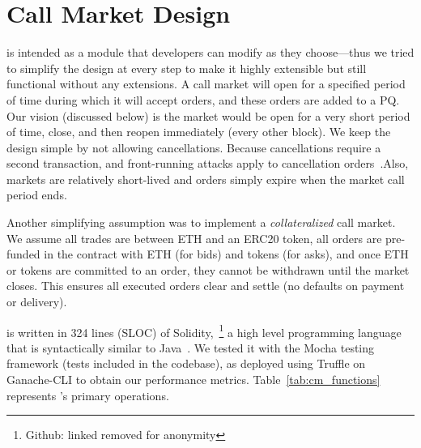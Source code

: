 
\section{Call Market Design}






\cm is intended as a module that developers can modify as they choose---thus we tried to simplify the design at every step to make it highly extensible but still functional without any extensions. A call market will open for a specified period of time during which it will accept orders, and these orders are added to a PQ. Our vision (discussed below) is the market would be open for a very short period of time, close, and then reopen immediately (\eg every other block). We keep the design simple by not allowing cancellations. Because cancellations require a second transaction, and front-running attacks apply to cancellation orders~\cite{eskandari2019sok}.Also, markets are relatively short-lived and orders simply expire when the market call period ends.

Another simplifying assumption was to implement a \textit{collateralized} call market. We assume all trades are between ETH and an ERC20 token, all orders are pre-funded in the contract with ETH (for bids) and tokens (for asks), and once ETH or tokens are committed to an order, they cannot be withdrawn until the market closes. This ensures all executed orders clear and settle (\ie no defaults on payment or delivery).





\cm is written in 324 lines (SLOC) of Solidity,~\footnote{Github: linked removed for anonymity} a high level programming language that is syntactically similar to Java~\cite{Ethereum41:online}. We tested it with the Mocha testing framework (tests included in the codebase), as deployed using Truffle on Ganache-CLI to obtain our performance metrics. Table~\ref{tab:cm_functions} represents \cm's primary operations. 


